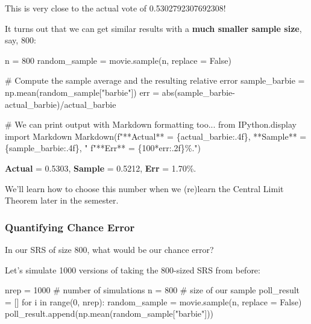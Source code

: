\documentclass[
  letterpaper,
  DIV=11,
  numbers=noendperiod]{scrreprt}
\newenvironment{Shaded}{\begin{snugshade}}{\end{snugshade}}
\newcommand{\BuiltInTok}[1]{\textcolor[rgb]{0.00,0.23,0.31}{#1}}
\newcommand{\CommentTok}[1]{\textcolor[rgb]{0.37,0.37,0.37}{#1}}
\newcommand{\ControlFlowTok}[1]{\textcolor[rgb]{0.00,0.23,0.31}{#1}}
\newcommand{\DecValTok}[1]{\textcolor[rgb]{0.68,0.00,0.00}{#1}}
\newcommand{\ImportTok}[1]{\textcolor[rgb]{0.00,0.46,0.62}{#1}}
\newcommand{\KeywordTok}[1]{\textcolor[rgb]{0.00,0.23,0.31}{#1}}
\newcommand{\NormalTok}[1]{\textcolor[rgb]{0.00,0.23,0.31}{#1}}
\newcommand{\OperatorTok}[1]{\textcolor[rgb]{0.37,0.37,0.37}{#1}}
\newcommand{\SpecialCharTok}[1]{\textcolor[rgb]{0.37,0.37,0.37}{#1}}
\newcommand{\SpecialStringTok}[1]{\textcolor[rgb]{0.13,0.47,0.30}{#1}}
\newcommand{\StringTok}[1]{\textcolor[rgb]{0.13,0.47,0.30}{#1}}
\newcommand{\VariableTok}[1]{\textcolor[rgb]{0.07,0.07,0.07}{#1}}
\begin{document}
This is very close to the actual vote of 0.5302792307692308!

It turns out that we can get similar results with a \textbf{much smaller
sample size}, say, 800:

\begin{Shaded}
\begin{Highlighting}[]
\NormalTok{n }\OperatorTok{=} \DecValTok{800}
\NormalTok{random\_sample }\OperatorTok{=}\NormalTok{ movie.sample(n, replace }\OperatorTok{=} \VariableTok{False}\NormalTok{)}

\CommentTok{\# Compute the sample average and the resulting relative error}
\NormalTok{sample\_barbie }\OperatorTok{=}\NormalTok{ np.mean(random\_sample[}\StringTok{"barbie"}\NormalTok{])}
\NormalTok{err }\OperatorTok{=} \BuiltInTok{abs}\NormalTok{(sample\_barbie}\OperatorTok{{-}}\NormalTok{actual\_barbie)}\OperatorTok{/}\NormalTok{actual\_barbie}

\CommentTok{\# We can print output with Markdown formatting too...}
\ImportTok{from}\NormalTok{ IPython.display }\ImportTok{import}\NormalTok{ Markdown}
\NormalTok{Markdown(}\SpecialStringTok{f"**Actual** = }\SpecialCharTok{\{}\NormalTok{actual\_barbie}\SpecialCharTok{:.4f\}}\SpecialStringTok{, **Sample** = }\SpecialCharTok{\{}\NormalTok{sample\_barbie}\SpecialCharTok{:.4f\}}\SpecialStringTok{, "}
         \SpecialStringTok{f"**Err** = }\SpecialCharTok{\{}\DecValTok{100}\OperatorTok{*}\NormalTok{err}\SpecialCharTok{:.2f\}}\SpecialStringTok{\%."}\NormalTok{)}
\end{Highlighting}
\end{Shaded}

\textbf{Actual} = 0.5303, \textbf{Sample} = 0.5212, \textbf{Err} =
1.70\%.

We'll learn how to choose this number when we (re)learn the Central
Limit Theorem later in the semester.

\subsubsection{Quantifying Chance Error}\label{quantifying-chance-error}

In our SRS of size 800, what would be our chance error?

Let's simulate 1000 versions of taking the 800-sized SRS from before:

\begin{Shaded}
\begin{Highlighting}[]
\NormalTok{nrep }\OperatorTok{=} \DecValTok{1000}   \CommentTok{\# number of simulations}
\NormalTok{n }\OperatorTok{=} \DecValTok{800}       \CommentTok{\# size of our sample}
\NormalTok{poll\_result }\OperatorTok{=}\NormalTok{ []}
\ControlFlowTok{for}\NormalTok{ i }\KeywordTok{in} \BuiltInTok{range}\NormalTok{(}\DecValTok{0}\NormalTok{, nrep):}
\NormalTok{    random\_sample }\OperatorTok{=}\NormalTok{ movie.sample(n, replace }\OperatorTok{=} \VariableTok{False}\NormalTok{)}
\NormalTok{    poll\_result.append(np.mean(random\_sample[}\StringTok{"barbie"}\NormalTok{]))}
\end{Highlighting}
\end{Shaded}
\end{document}
